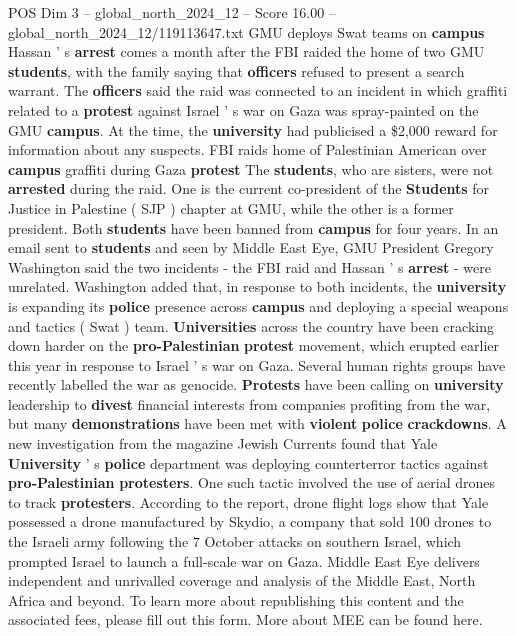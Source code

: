 \begin{textsample}{POS Dim 3 – global\_north\_2024\_12 – Score 16.00 – global\_north\_2024\_12/119113647.txt}
GMU deploys Swat teams on \textbf{campus} Hassan ' s \textbf{arrest} comes a month after the FBI raided the home of two GMU \textbf{students}, with the family saying that \textbf{officers} refused to present a search warrant.
The \textbf{officers} said the raid was connected to an incident in which graffiti related to a \textbf{protest} against Israel ' s war on Gaza was spray-painted on the GMU \textbf{campus}.
At the time, the \textbf{university} had publicised a \$2,000 reward for information about any suspects.
FBI raids home of Palestinian American over \textbf{campus} graffiti during Gaza \textbf{protest} The \textbf{students}, who are sisters, were not \textbf{arrested} during the raid.
One is the current co-president of the \textbf{Students} for Justice in Palestine ( SJP ) chapter at GMU, while the other is a former president.
Both \textbf{students} have been banned from \textbf{campus} for four years.
In an email sent to \textbf{students} and seen by Middle East Eye, GMU President Gregory Washington said the two incidents - the FBI raid and Hassan ' s \textbf{arrest} - were unrelated.
Washington added that, in response to both incidents, the \textbf{university} is expanding its \textbf{police} presence across \textbf{campus} and deploying a special weapons and tactics ( Swat ) team. \textbf{Universities} across the country have been cracking down harder on the \textbf{pro-Palestinian} \textbf{protest} movement, which erupted earlier this year in response to Israel ' s war on Gaza.
Several human rights groups have recently labelled the war as genocide. \textbf{Protests} have been calling on \textbf{university} leadership to \textbf{divest} financial interests from companies profiting from the war, but many \textbf{demonstrations} have been met with \textbf{violent} \textbf{police} \textbf{crackdowns}.
A new investigation from the magazine Jewish Currents found that Yale \textbf{University} ' s \textbf{police} department was deploying counterterror tactics against \textbf{pro-Palestinian} \textbf{protesters}.
One such tactic involved the use of aerial drones to track \textbf{protesters}.
According to the report, drone flight logs show that Yale possessed a drone manufactured by Skydio, a company that sold 100 drones to the Israeli army following the 7 October attacks on southern Israel, which prompted Israel to launch a full-scale war on Gaza.
Middle East Eye delivers independent and unrivalled coverage and analysis of the Middle East, North Africa and beyond.
To learn more about republishing this content and the associated fees, please fill out this form.
More about MEE can be found here.

\end{textsample}
